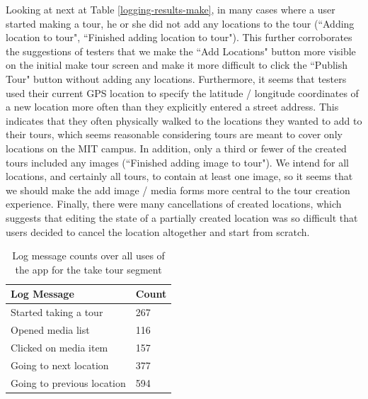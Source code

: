 \documentclass{sigchi}
\begin{document}
Looking at next at Table \ref{logging-results-make}, in many cases where a user started making a tour, he or she did not add any locations to the tour (``Adding location to tour", ``Finished adding location to tour"). This further corroborates the suggestions of testers that we make the ``Add Locations" button more visible on the initial make tour screen and make it more difficult to click the ``Publish Tour" button without adding any locations. Furthermore, it seems that testers used their current GPS location to specify the latitude / longitude coordinates of a new location more often than they explicitly entered a street address. This indicates that they often physically walked to the locations they wanted to add to their tours, which seems reasonable considering tours are meant to cover only locations on the MIT campus. In addition, only a third or fewer of the created tours included any images (``Finished adding image to tour"). We intend for all locations, and certainly all tours, to contain at least one image, so it seems that we should make the add image / media forms more central to the tour creation experience. Finally, there were many cancellations of created locations, which suggests that editing the state of a partially created location was so difficult that users decided to cancel the location altogether and start from scratch.

\begin{table}
\begin{tabular}{|l|l|}\hline
\textbf{Log Message} & \textbf{Count} \\ \hline
 Started taking a tour & 267 \\ \hline
 Opened media list & 116 \\ \hline
 Clicked on media item & 157 \\ \hline
 Going to next location & 377 \\ \hline
 Going to previous location & 594 \\ \hline
\end{tabular}
\caption{Log message counts over all uses of the app for the take tour segment}
\label{logging-results-take}
\end{table}
\end{document}
